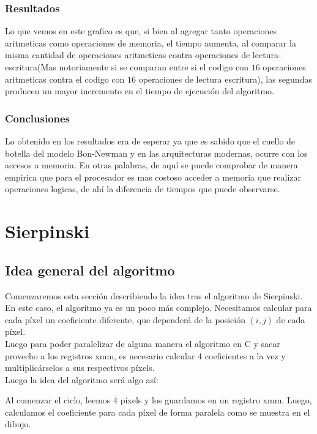 \documentclass[a4paper]{article}
\begin{document}
\subsubsection{Resultados}
Lo que vemos en este grafico es que, si bien al agregar tanto operaciones aritmeticas como operaciones de memoria, el tiempo aumenta, al comparar la misma cantidad de operaciones aritmeticas contra operaciones de lectura-escritura(Mas notoriamente si se comparan entre si el codigo con $16$ operaciones aritmeticas contra el codigo con $16$ operaciones de lectura escritura), las segundas producen un mayor incremento en el tiempo de ejecución del algoritmo.

\subsubsection{Conclusiones}

Lo obtenido en los resultados era de esperar ya que es sabido que el cuello de botella del modelo Bon-Newman y en las arquitecturas modernas, ocurre con los accesos a memoria. En otras palabras, de aquí se puede comprobar de manera empirica que para el procesador es mas costoso acceder a memoria que realizar operaciones logicas, de ahí la diferencia de tiempos que puede observarse. 

\newpage
\section{Sierpinski}

\subsection{Idea general del algoritmo}

Comenzaremos esta sección describiendo la idea tras el algoritmo de Sierpinski. En este caso, el algoritmo ya es un poco más complejo. Necesitamos calcular para cada píxel un coeficiente diferente, que dependerá de la posición $(i,j)$ de cada píxel.
\\
Luego para poder paralelizar de alguna manera el algoritmo en C y sacar provecho a los registros xmm, es necesario calcular 4 coeficientes a la vez y multiplicárselos a sus respectivos píxels.
\\
Luego la idea del algoritmo será algo así:

Al comenzar el ciclo, leemos 4 píxels y los guardamos en un registro xmm. Luego, calculamos el coeficiente para cada píxel de forma paralela como se muestra en el dibujo.
\end{document}
